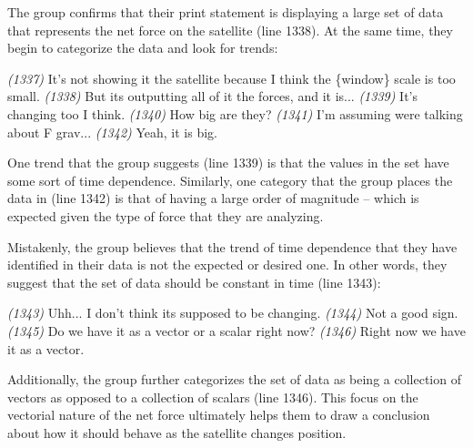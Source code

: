 \documentclass{msuphddissertation}
\begin{document}
\begin{doublespace}
The group confirms that their print statement is displaying a large set of data that represents the net force on the satellite (line 1338).  At the same time, they begin to categorize the data and look for trends:  \begin{description}
\SD \textit{(1337)} It's not showing it {the satellite} because I think the \{window\} scale is too small.
\SD \textit{(1338)} But its outputting all of it {the forces}, and it is...
\SD \textit{(1339)} It's changing too I think.
\SB \textit{(1340)} How big are they?		
\SB \textit{(1341)} I'm assuming were talking about F grav...
\SC \textit{(1342)} Yeah, it is big.
\end{description}  One trend that the group suggests (line 1339) is that the values in the set have some sort of time dependence.  Similarly, one category that the group places the data in (line 1342) is that of having a large order of magnitude -- which is expected given the type of force that they are analyzing.

Mistakenly, the group believes that the trend of time dependence that they have identified in their data is not the expected or desired one.  In other words, they suggest that the set of data should be constant in time (line 1343):  \begin{description}
\SB \textit{(1343)} Uhh... I don't think its supposed to be changing.
\SB \textit{(1344)} Not a good sign.
\SB \textit{(1345)} Do we have it as a vector or a scalar right now?
\SD \textit{(1346)} Right now we have it as a vector.
\end{description}  Additionally, the group further categorizes the set of data as being a collection of vectors as opposed to a collection of scalars (line 1346).  This focus on the vectorial nature of the net force ultimately helps them to draw a conclusion about how it should behave as the satellite changes position.


\end{doublespace}
\end{document}
